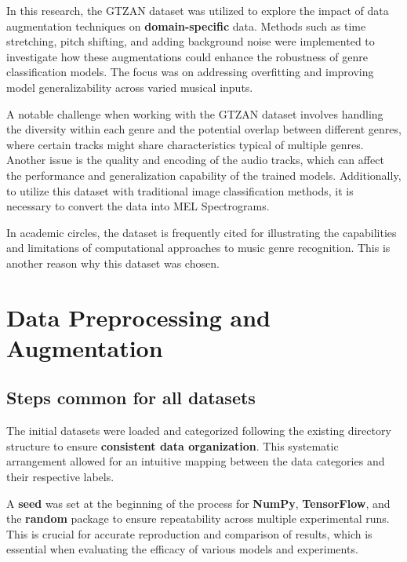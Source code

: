 In this research, the GTZAN dataset was utilized to explore the impact of data augmentation techniques on \textbf{domain-specific} data. Methods such as time stretching, pitch shifting, and adding background noise were implemented to investigate how these augmentations could enhance the robustness of genre classification models. The focus was on addressing overfitting and improving model generalizability across varied musical inputs.

A notable challenge when working with the GTZAN dataset involves handling the diversity within each genre and the potential overlap between different genres, where certain tracks might share characteristics typical of multiple genres. Another issue is the quality and encoding of the audio tracks, which can affect the performance and generalization capability of the trained models. Additionally, to utilize this dataset with traditional image classification methods, it is necessary to convert the data into MEL Spectrograms. 

In academic circles, the dataset is frequently cited for illustrating the capabilities and limitations of computational approaches to music genre recognition. This is another reason why this dataset was chosen.


\section{Data Preprocessing and Augmentation}

\subsection{Steps common for all datasets}
\label{ssec:commonProcessing}

The initial datasets were loaded and categorized following the existing directory structure to ensure \textbf{consistent data organization}. This systematic arrangement allowed for an intuitive mapping between the data categories and their respective labels.

A \textbf{seed} was set at the beginning of the process for \textbf{NumPy}, \textbf{TensorFlow}, and the \textbf{random} package to ensure repeatability across multiple experimental runs. This is crucial for accurate reproduction and comparison of results, which is essential when evaluating the efficacy of various models and experiments.

